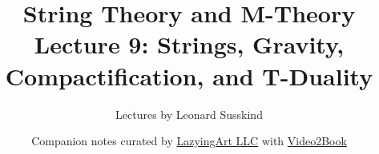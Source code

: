 \documentclass[11pt,oneside]{book}
\begin{document}
\hypersetup{pageanchor=false}
\frontmatter
\title{String Theory and M-Theory\\[0.45em]
\large Lecture 9: Strings, Gravity, Compactification, and T-Duality}
\author{Lectures by Leonard Susskind}
\date{Companion notes curated by
\href{https://lazying.art}{LazyingArt LLC} with
\href{https://github.com/lachlanchen/Video2Book}{Video2Book}}
\maketitle
\clearpage
\hypersetup{pageanchor=true}
\mainmatter

\end{document}
